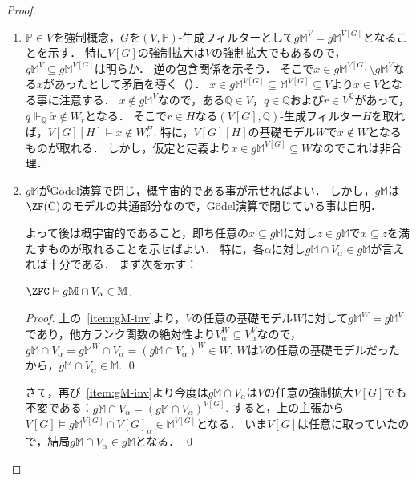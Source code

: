 \documentclass[a4j,leqno]{ltjsarticle}
\renewcommand{\emph}[1]{\textgt{\textsf{#1}}}
\newcommand{\mantle}{\mathbb{M}}
\newcommand{\M}{\mantle}
\newcommand{\gM}{g\mathbb{M}}
\begin{document}
\begin{proof}
 \begin{enumerate}
  \item $\mathbb{P} \in V$を強制概念，$G$を$(V, \mathbb{P})$-生成フィルターとして$\gM^V = \gM^{V[G]}$となることを示す．
        特に$V[G]$の強制拡大は$V$の強制拡大でもあるので，$\gM^{V} \subseteq \gM^{V[G]}$は明らか．
        逆の包含関係を示そう．
        そこで$x \in \gM^{V[G]} \setminus \gM^V$なる$x$があったとして矛盾を導く（\emph{背理法}）．
        $x \in \gM^{V[G]} \subseteq \M^{V[G]} \subseteq V$より$x \in V$となる事に注意する．
        $x \notin \gM^V$なので，ある$\mathbb{Q} \in V$，$q \in \mathbb{Q}$および$\dot{r} \in V^{\mathbb{Q}}$があって，$q \Vdash_{\mathbb{Q}} \check{x} \notin W_{\dot{r}}$となる．
        そこで$r \in H$なる$(V[G], \mathbb{Q})$-生成フィルター$H$を取れば，$V[G][H] \models x \notin W_{r}^{H}$.
        特に，$V[G][H]$の基礎モデル$W$で$x \notin W$となるものが取れる．
        しかし，仮定と定義より$x \in \gM^{V[G]} \subseteq W$なのでこれは非合理．
  \item $\gM$がG\"{o}del演算で閉じ，概宇宙的である事が示せればよい．
        しかし，$\gM$は$\ZF(\mathrm{C})$のモデルの共通部分なので，G\"{o}del演算で閉じている事は自明．

        よって後は概宇宙的であること，即ち任意の$x \subseteq \gM$に対し$z \in \gM$で$x \subseteq z$を満たすものが取れることを示せばよい．
        特に，各$\alpha$に対し$\gM \cap V_\alpha \in \gM$が言えれば十分である．
        まず次を示す：
        \begin{claim}
         $\ZFC \vdash \gM \cap V_\alpha \in \M$.
        \end{claim}
        \begin{proof}
         上の~\ref{item:gM-inv}より，$V$の任意の基礎モデル$W$に対して$\gM^W = \gM^V$であり，他方ランク関数の絶対性より$V_\alpha^W \subseteq V_\alpha^V$なので，$\gM \cap V_\alpha = \gM^W \cap V_\alpha = (\gM \cap V_\alpha)^W \in W$.
         $W$は$V$の任意の基礎モデルだったから，$\gM \cap V_\alpha \in\M $. \qed
        \end{proof}
        さて，再び~\ref{item:gM-inv}より今度は$\gM \cap V_\alpha$は$V$の任意の強制拡大$V[G]$でも不変である：$\gM \cap V_\alpha = (\gM \cap V_\alpha)^{V[G]}$.
        すると，上の主張から$V[G] \models \gM^{V[G]} \cap V[G]_\alpha \in \M^{V[G]}$となる．
        いま$V[G]$は任意に取っていたので，結局$\gM \cap V_\alpha \in \gM$となる． \qed
 \end{enumerate}
\end{proof}
\end{document}
